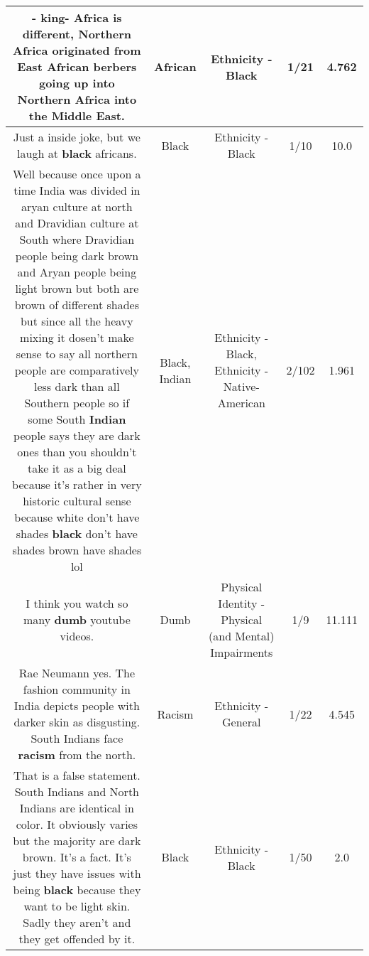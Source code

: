 \documentclass[11pt]{article}
\newlength\mylength
\begin{document}
\begin{center}
\begin{longtable}{|C{.65\mylength}|C{.30\mylength}|C{.12\mylength}|C{.12\mylength}|C{.12\mylength}|}
  \small - king- Africa is different, Northern Africa originated from East \textbf{African} berbers going up into Northern Africa into the Middle East.\normalsize   & African & Ethnicity - Black & 1/21 & 4.762 \\  \hline
  \small Just a inside joke, but we laugh at \textbf{black} africans.\normalsize   & Black & Ethnicity - Black & 1/10 & 10.0 \\  \hline
  \small Well because once upon a time India was divided in aryan culture at north and Dravidian culture at South where Dravidian people being dark brown and Aryan people being light brown but both are brown of different shades but since all the heavy mixing it dosen't make sense to say all northern people are comparatively less dark than all Southern people  so if some South \textbf{Indian} people says they are dark ones than you shouldn't take it as a big deal because it's rather in very historic cultural sense  because white don't have shades \textbf{black} don't have shades brown have shades lol\normalsize   & Black, Indian & Ethnicity - Black, Ethnicity - Native-American & 2/102 & 1.961 \\  \hline
  \small I think you watch so many \textbf{dumb} youtube videos.\normalsize   & Dumb & Physical Identity - Physical (and Mental) Impairments & 1/9 & 11.111 \\  \hline
  \small Rae Neumann yes. The fashion community in India depicts people with darker skin as disgusting. South Indians face \textbf{racism} from the north.\normalsize   & Racism & Ethnicity - General & 1/22 & 4.545 \\  \hline
  \small That is a false statement. South Indians and North Indians are identical in color. It obviously varies but the majority are dark brown. It's a fact. It's just they have issues with being \textbf{black} because they want to be light skin. Sadly they aren't and they get offended by it.\normalsize   & Black & Ethnicity - Black & 1/50 & 2.0 \\  \hline

\end{longtable}
\end{center}
\end{document}
